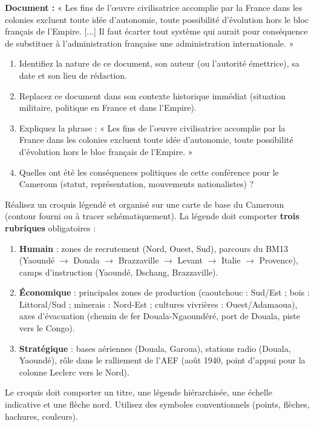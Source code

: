 \documentclass[11pt]{article}
\newcounter{popsec}
\newcounter{popsub}
\newcommand{\courssub}[1]{%
  \stepcounter{popsub}%
  \par\vspace{9pt}\noindent{\popxbold\fontsize{11.5}{13}\selectfont\color{popink}{\color{poporange}\thepopsec.\thepopsub}\hspace{6pt}#1}\par\nopagebreak\vspace{4pt}
}
\begin{document}
\courssub{Je m'entraîne}

\begin{exercice}
\textbf{Document :} « Les fins de l'œuvre civilisatrice accomplie par la France dans les colonies excluent toute idée d'autonomie, toute possibilité d'évolution hors le bloc français de l'Empire. [...] Il faut écarter tout système qui aurait pour conséquence de substituer à l'administration française une administration internationale. »
\begin{enumerate}
\item Identifiez la nature de ce document, son auteur (ou l'autorité émettrice), sa date et son lieu de rédaction.
\item Replacez ce document dans son contexte historique immédiat (situation militaire, politique en France et dans l'Empire).
\item Expliquez la phrase : « Les fins de l'œuvre civilisatrice accomplie par la France dans les colonies excluent toute idée d'autonomie, toute possibilité d'évolution hors le bloc français de l'Empire. »
\item Quelles ont été les conséquences politiques de cette conférence pour le Cameroun (statut, représentation, mouvements nationalistes) ?
\end{enumerate}
\end{exercice}

\begin{exercice}
Réalisez un croquis légendé et organisé sur une carte de base du Cameroun (contour fourni ou à tracer schématiquement). La légende doit comporter \textbf{trois rubriques} obligatoires :
\begin{enumerate}
\item \textbf{Humain} : zones de recrutement (Nord, Ouest, Sud), parcours du BM13 (Yaoundé $\to$ Douala $\to$ Brazzaville $\to$ Levant $\to$ Italie $\to$ Provence), camps d'instruction (Yaoundé, Dschang, Brazzaville).
\item \textbf{Économique} : principales zones de production (caoutchouc : Sud/Est ; bois : Littoral/Sud ; minerais : Nord-Est ; cultures vivrières : Ouest/Adamaoua), axes d'évacuation (chemin de fer Douala-Ngaoundéré, port de Douala, piste vers le Congo).
\item \textbf{Stratégique} : bases aériennes (Douala, Garoua), stations radio (Douala, Yaoundé), rôle dans le ralliement de l'AEF (août 1940, point d'appui pour la colonne Leclerc vers le Nord).
\end{enumerate}
Le croquis doit comporter un titre, une légende hiérarchisée, une échelle indicative et une flèche nord. Utilisez des symboles conventionnels (points, flèches, hachures, couleurs).
\end{exercice}
\end{document}

